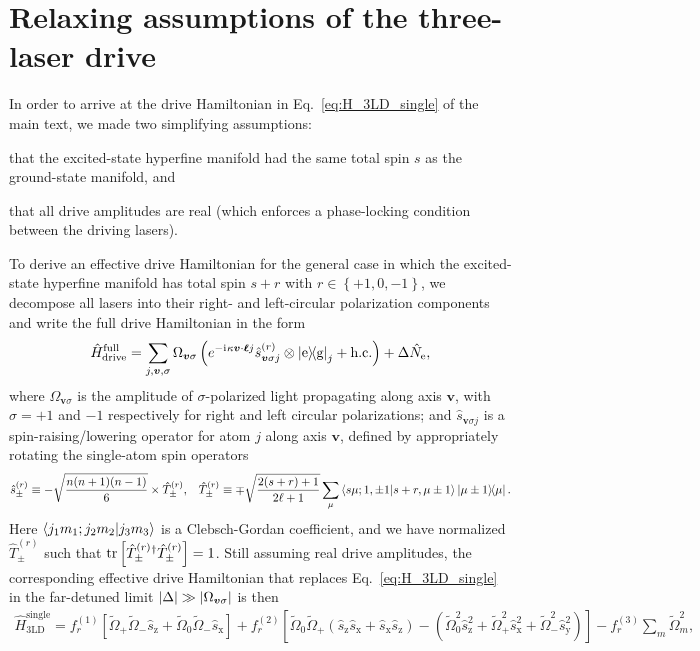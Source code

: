 \documentclass[aps,pra,nofootinbib,twocolumn,superscriptaddress]{revtex4-2}
\renewcommand{\t}{\text} %
\newcommand{\f}[2]{\dfrac{#1}{#2}} %
\newcommand{\p}[1]{\left(#1\right)} %
\renewcommand{\sp}[1]{\left[#1\right]} %
\renewcommand{\set}[1]{\left\{#1\right\}} %
\newcommand{\bk}{\braket} %
\renewcommand{\v}{\bm} %
\renewcommand{\i}{\mathrm{i}\mkern1mu} %
\newcommand{\1}{\mathds{1}}
\newcommand{\s}{\hat s}
\renewcommand{\H}{\hat H}
\newcommand{\x}{\text{x}}
\newcommand{\y}{\text{y}}
\newcommand{\z}{\text{z}}
\newcommand{\g}{\text{g}}
\newcommand{\e}{\text{e}}
\begin{document}
\section{Relaxing assumptions of the three-laser drive}
\label{sec:full_drive}

In order to arrive at the drive Hamiltonian in Eq.~\eqref{eq:H_3LD_single} of the main text, we made two simplifying assumptions:
\begin{enumerate*}
\item that the excited-state hyperfine manifold had the same total spin $s$ as the ground-state manifold, and
\item that all drive amplitudes are real (which enforces a phase-locking condition between the driving lasers).
\end{enumerate*}
To derive an effective drive Hamiltonian for the general case in which the excited-state hyperfine manifold has total spin $s+r$ with $r\in\set{+1,0,-1}$, we decompose all lasers into their right- and left-circular polarization components and write the full drive Hamiltonian in the form
\begin{align}
  \H_{\t{drive}}^{\t{full}}
  = \sum_{j,\v v,\sigma} \Omega_{\v v\sigma}
  \p{e^{-\i\kappa\v v\cdot\v\ell j} \s_{\v v\sigma j}^{(r)}
    \otimes\op{\e}{\g}_j + \t{h.c.}}
  + \Delta \hat N_\e,
\end{align}
where $\Omega_{\v v\sigma}$ is the amplitude of $\sigma$-polarized light propagating along axis $\v v$, with $\sigma=+1$ and $-1$ respectively for right and left circular polarizations; and $\s_{\v v\sigma j}$ is a spin-raising/lowering operator for atom $j$ along axis $\v v$, defined by appropriately rotating the single-atom spin operators
\begin{align}
  \s_\pm^{(r)}
  \equiv -\sqrt{\f{n(n+1)(n-1)}{6}} \times \hat T_\pm^{(r)},
  &&
  \hat T_\pm^{(r)} \equiv \mp\sqrt{\f{2(s+r)+1}{2\ell+1}}
  \sum_\mu \bk{s\mu;1,\pm1|s+r,\mu\pm1} \op{\mu\pm1}{\mu}.
\end{align}
Here $\bk{j_1m_1;j_2m_2|j_3m_3}$ is a Clebsch-Gordan coefficient, and we have normalized $\hat T_\pm^{(r)}$ such that $\tr\sp{\hat T_\pm^{(r)}{}^\dag \hat T_\pm^{(r)}}=1$.
Still assuming real drive amplitudes, the corresponding effective drive Hamiltonian that replaces Eq.~\eqref{eq:H_3LD_single} in the far-detuned limit $\abs{\Delta}\gg\abs{\Omega_{\v v\sigma}}$ is then
\begin{align}
  \H_{\t{3LD}}^{\t{single}}
  = f_r^{(1)} \sp{\tilde\Omega_+ \tilde\Omega_- \s_\z
    + \tilde\Omega_0 \tilde\Omega_- \s_\x}
  + f_r^{(2)} \sp{\tilde\Omega_0 \tilde\Omega_+
    (\s_\z \s_\x  + \s_\x \s_\z)
    - \p{\tilde\Omega_0^2 \s_\z^2
      + \tilde\Omega_+^2 \s_\x^2
      + \tilde\Omega_-^2 \s_\y^2}}
  - f_r^{(3)} \sum_m \tilde\Omega_m^2,
\end{align}
\end{document}
